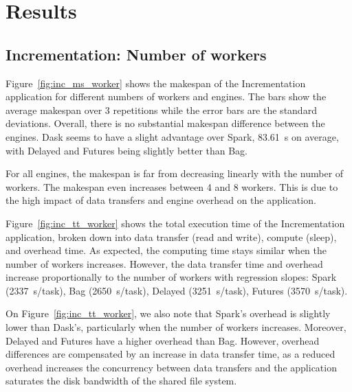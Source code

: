 \documentclass[conference]{IEEEtran}
\begin{document}
\section{Results}

\subsection{Incrementation: Number of workers}
Figure~\ref{fig:inc_ms_worker} shows the makespan of the Incrementation application
for different numbers of workers and engines. The bars show the average
makespan over 3 repetitions while the error bars are the standard deviations. Overall,
there is no substantial makespan difference between the engines. Dask seems to have a
slight advantage over Spark, \SI{83.61}{\second} on average,
with Delayed and Futures being slightly better than Bag.

For all engines, the makespan is far from decreasing linearly with the
number of workers. The makespan
even increases between 4 and 8 workers. This is due to the high impact of
data transfers and engine overhead on the application. 

Figure~\ref{fig:inc_tt_worker} shows the total execution time of the
Incrementation application, broken down into data transfer (read and
write), compute (sleep), and overhead time. As expected, the computing time
stays similar when the number of workers increases. However, the data
transfer time and overhead increase proportionally to the number of
workers with regression slopes: Spark (\SI{2337}{\second/task}), Bag
(\SI{2650}{\second/task}), Delayed (\SI{3251}{\second/task}), Futures
(\SI{3570}{\second/task}).

On Figure~\ref{fig:inc_tt_worker}, we also note that Spark's overhead is
slightly lower than Dask's, particularly when the number of workers
increases. Moreover, Delayed and Futures have a higher overhead than Bag.
However, overhead differences are compensated by an increase in data
transfer time, as a reduced overhead increases the concurrency between data
transfers and the application saturates the disk bandwidth of the shared file system.
\end{document}
